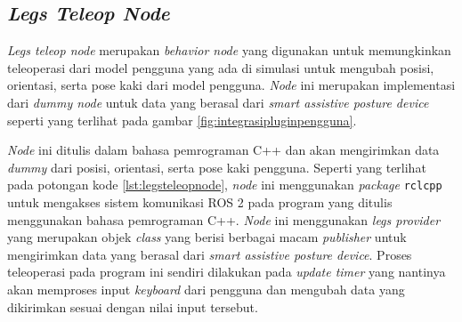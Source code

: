 \subsection{\emph{Legs Teleop Node}}
\label{subsec:legsteleopnode}

\emph{Legs teleop node} merupakan \emph{behavior node} yang digunakan untuk memungkinkan teleoperasi dari model pengguna yang ada di simulasi untuk mengubah posisi, orientasi, serta pose kaki dari model pengguna.
\emph{Node} ini merupakan implementasi dari \emph{dummy node} untuk data yang berasal dari \emph{smart assistive posture device} seperti yang terlihat pada gambar \ref{fig:integrasipluginpengguna}.



\emph{Node} ini ditulis dalam bahasa pemrograman C++ dan akan mengirimkan data \emph{dummy} dari posisi, orientasi, serta pose kaki pengguna.
Seperti yang terlihat pada potongan kode \ref{lst:legsteleopnode},
  \emph{node} ini menggunakan \emph{package} \lstinline{rclcpp} untuk mengakses sistem komunikasi ROS 2 pada program yang ditulis menggunakan bahasa pemrograman C++.
\emph{Node} ini menggunakan \emph{legs provider} yang merupakan objek \emph{class} yang berisi berbagai macam \emph{publisher} untuk mengirimkan data yang berasal dari \emph{smart assistive posture device}.
Proses teleoperasi pada program ini sendiri dilakukan pada \emph{update timer} yang nantinya akan memproses input \emph{keyboard} dari pengguna dan mengubah data yang dikirimkan sesuai dengan nilai input tersebut.
